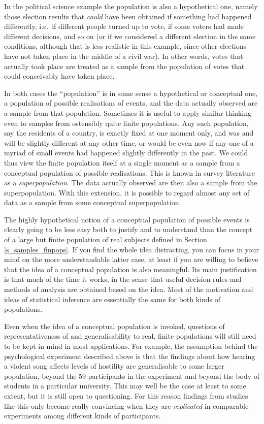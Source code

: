 In the political science example the population is also a hypothetical
one, namely those election results that \emph{could} have been obtained
if something had happened differently, i.e.\ if different people turned
up to vote, if some voters had made different decisions, and so on (or
if we considered a different election in the same conditions, although
that is less realistic in this example, since other elections have not
taken place in the middle of a civil war). In other words, votes that
actually took place are treated as a sample from the population of votes
that could conceivably have taken place.

In both cases the ``population'' is in some sense a hypothetical or
conceptual one, a population of possible realisations of events, and the
data actually observed are a sample from that population. Sometimes it
is useful to apply similar thinking even to samples from ostensibly
quite finite populations. Any such population, say the residents of a
country, is exactly fixed at one moment only, and was and will be
slightly different at any other time, or would be even now if any one of
a myriad of small events had happened slightly differently in the past.
We could thus view the finite population itself at a single moment as a
sample from a conceptual population of possible realisations. This is
known in survey literature as a \emph{superpopulation}. The data
actually observed are then also a sample from the superpopulation. With
this extension, it is possible to regard almost any set of data as a
sample from some conceptual superpopulation.

The highly hypothetical notion of a conceptual population of possible
events is clearly going to be less easy both to justify and to
understand than the concept of a large but finite population of real
subjects defined in Section \ref{s_samples_finpops}. If you find the
whole idea distracting, you can focus in your mind on the more
understandable latter case, at least if you are willing to believe that
the idea of a conceptual population is also meaningful. Its main
justification is that much of the time it works, in the sense that
useful decision rules and methods of analysis are obtained based on the
idea. Most of the motivation and ideas of statistical inference are
essentially the same for both kinds of populations.

Even when the idea of a conceptual population is invoked,
questions of representativeness of and generalisability to
real, finite populations will still need to be kept in mind in most
applications. For example, the assumption behind the psychological
experiment described above is that the findings about how hearing a
violent song affects levels of hostility are generalisable to some
larger population, beyond the 59 participants in the experiment and
beyond the body of students in a particular university. This may well be
the case at least to some extent, but it is still open to questioning.
For this reason findings from studies like this only become really
convincing when they are \emph{replicated} in comparable experiments
among different kinds of participants.

